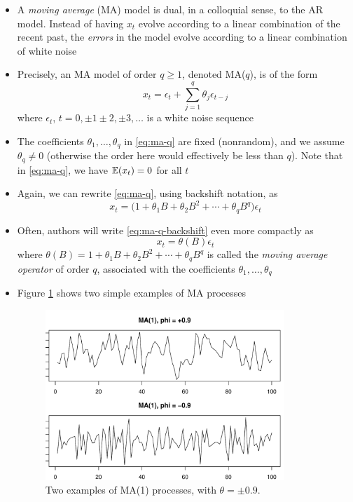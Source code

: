 \documentclass{article}
\begin{document}
\begin{itemize}
\item A \emph{moving average} (MA) model is dual, in a colloquial sense, to the
  AR model. Instead of having $x_t$ evolve according to a linear combination of
  the recent past, the \emph{errors} in the model evolve according to a linear
  combination of white noise

\item Precisely, an MA model of order $q \geq 1$, denoted MA($q$), is of the
  form 
  \begin{equation}
  \label{eq:ma-q}
  x_t = \epsilon_t + \sum_{j=1}^q \theta_j \epsilon_{t-j} 
  \end{equation}
  where $\epsilon_t$, $t = 0, \pm 1 \pm 2, \pm 3,\dots$ is a white noise
  sequence

\item The coefficients $\theta_1,\dots,\theta_q$ in \eqref{eq:ma-q} are fixed
  (nonrandom), and we assume $\theta_q \not= 0$ (otherwise the order here would 
  effectively be less than $q$). Note that in \eqref{eq:ma-q}, we have $\mathbb{E}(x_t)
  = 0$ for all $t$ 

\item Again, we can rewrite \eqref{eq:ma-q}, using backshift notation, as 
  \begin{equation}
  \label{eq:ma-q-backshift}
  x_t = \Big(1 + \theta_1 B + \theta_2 B^2 + \cdots + \theta_q B^q \Big)
  \epsilon_t  
  \end{equation}

\item Often, authors will write \eqref{eq:ma-q-backshift} even more compactly as   
  \begin{equation}
  \label{eq:ma-q-phi}
  x_t = \theta(B) \epsilon_t 
  \end{equation}
  where $\theta(B) = 1 + \theta_1 B + \theta_2 B^2 + \cdots + \theta_q B^q$ is
  called the \emph{moving average operator} of order $q$, associated with the
  coefficients $\theta_1,\dots,\theta_q$

\item Figure \ref{fig:ma} shows two simple examples of MA processes

\begin{figure}[htb]
\centering
\includegraphics[width=0.85\textwidth]{fig/ma-1.pdf}
\caption{Two examples of MA(1) processes, with $\theta = \pm 0.9$.}
\label{fig:ma}
\end{figure}
\end{itemize}
\end{document}

